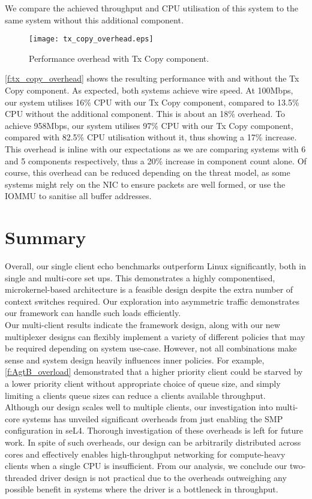 We compare the achieved throughput and CPU utilisation of this system to the same system without this additional component. 

\begin{figure}[h]
    \centering
    \texttt{[image: tx\_copy\_overhead.eps]}
    \caption{Performance overhead with Tx Copy component.}
    \label{f:tx_copy_overhead}
\end{figure}

\autoref{f:tx_copy_overhead} shows the resulting performance with and without the Tx Copy component. As expected, both
systems achieve wire speed. At 100Mbps, our system utilises 16\% CPU with our Tx Copy component, compared to 13.5\% CPU 
without the additional component. This is about an 18\% overhead. To achieve 958Mbps, our system utilises 97\% CPU with our Tx
Copy component, compared with 82.5\% CPU utilisation without it, thus showing a 17\% increase. This overhead is 
inline with our expectations as we are comparing systems with 6 and 5 components respectively, thus a 20\% increase
in component count alone. Of course, this overhead can be reduced depending on the threat model, as some systems might
rely on the NIC to ensure packets are well formed, or use the IOMMU to sanitise all buffer addresses.  

\section{Summary}

Overall, our single client echo benchmarks outperform Linux significantly, both in single and multi-core set ups.
This demonstrates a highly componentised, microkernel-based architecture is a feasible design despite the extra number
of context switches required. Our exploration into asymmetric traffic demonstrates our framework 
can handle such loads efficiently.\\
Our multi-client results indicate the framework design, along with our new multiplexer 
designs can flexibly implement a variety of different policies that may be required depending on system use-case.
However, not all combinations make sense and system design heavily influences inner policies. 
For example, \autoref{f:AgtB_overload} demonstrated
that a higher priority client could be starved by a lower priority client without appropriate choice
of queue size, and simply limiting a clients queue sizes can reduce a clients available throughput.\\

Although our design scales well to multiple clients, our investigation into multi-core systems has 
unveiled significant overheads from just enabling the SMP configuration in seL4.
Thorough investigation of these overheads is left for future work. In spite of such overheads, our design can
be arbitrarily distributed across cores and effectively enables high-throughput networking for compute-heavy clients when a 
single CPU is insufficient. From our analysis, we conclude our two-threaded driver design is not practical
due to the overheads outweighing any possible benefit in systems where the driver is a bottleneck in throughput.\\

